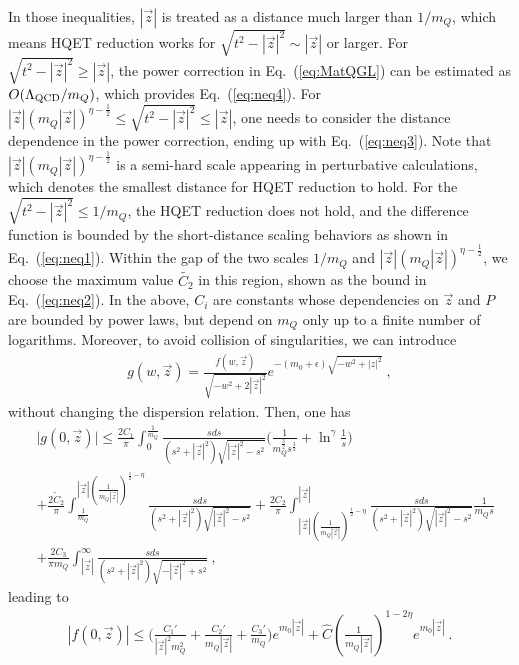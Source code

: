 \documentclass[a4paper,11pt]{article}
\begin{document}
In those inequalities, $|\vec{z}|$ is treated as a distance much larger than $1/m_Q$, which means HQET reduction works for $\sqrt{t^2-|\vec{z}|^2} \sim |\vec{z}|$ or larger. For $\sqrt{t^2-|\vec{z}|^2} \geq |\vec{z}|$, the power correction in Eq.~(\ref{eq:MatQGL}) can be estimated as $O(\Lambda_{\rm QCD}/m_Q)$, which provides Eq.~(\ref{eq:neq4}). For $|\vec{z}|\left(m_Q |\vec{z}|\right)^{\eta-\frac{1}{2}} \le \sqrt{t^2-|\vec{z}|^2}\le |\vec{z}|$, one needs to consider the distance dependence in the power correction, ending up with Eq.~(\ref{eq:neq3}). Note that $|\vec{z}|\left(m_Q |\vec{z}|\right)^{\eta-\frac{1}{2}}$ is a semi-hard scale appearing in perturbative calculations, which denotes the smallest distance for HQET reduction to hold. For the $\sqrt{t^2-|\vec{z}|^2} \le 1/m_Q$, the HQET reduction does not hold, and the difference function is bounded by the short-distance scaling behaviors as shown in Eq.~(\ref{eq:neq1}). Within the gap of the two scales $1/m_Q$ and $|\vec{z}|\left(m_Q |\vec{z}|\right)^{\eta-\frac{1}{2}}$, we choose the maximum value $\tilde{C_2}$ in this region, shown as the bound in Eq.~(\ref{eq:neq2}). In the above, $C_i$ are constants whose dependencies on $\vec{z}$ and $P$ are bounded by power laws, but depend on $m_Q$ only up to a finite number of logarithms. Moreover, to avoid collision of singularities, we can introduce 
\begin{align}
g(w,\vec{z})=\frac{f(w,\vec{z})}{\sqrt{-w^2+2|\vec{z}|^2}}e^{-(m_0+\epsilon)\sqrt{-w^2+|z|^2}} \ , 
\end{align}
without changing the dispersion relation. Then, one has
\begin{align}
&\bigg|g(0,\vec{z})\bigg| \le \frac{2C_1}{\pi}\int_0^{\frac{1}{m_Q}} \frac{sds}{(s^2+|\vec{z}|^2)\sqrt{|\vec{z}|^2-s^2}} \bigg(\frac{1}{m_Q^{\frac{3}{2}}s^{\frac{3}{2}}}+\ln^{\gamma}\frac{1}{s}\bigg) \nonumber \\ 
&+\frac{2\tilde C_2}{\pi}\int_{\frac{1}{m_Q}}^{ |\vec{z}|\left(\frac{1}{m_Q |\vec{z}|}\right)^{\frac{1}{2}-\eta}} \frac{sds} {(s^2+|\vec{z}|^2)\sqrt{|\vec{z}|^2-s^2}}+\frac{2C_2}{\pi}\int_{|\vec{z}|\left(\frac{1}{m_Q |\vec{z}|}\right)^{\frac{1}{2}-\eta}}^{|\vec{z}|} \frac{sds} {(s^2+|\vec{z}|^2)\sqrt{|\vec{z}|^2-s^2}} \frac{1}{m_Qs}\nonumber \\ 
&+\frac{2C_3 }{\pi m_Q}\int_{|\vec{z}|}^{\infty} \frac{sds} {(s^2+|\vec{z}|^2)\sqrt{-|\vec{z}|^2+s^2}}  \ ,
\end{align}
leading to
\begin{align}
|f(0,\vec{z})| \le \bigg(\frac{C_1'}{|\vec{z}|^2m_Q^2}+\frac{C_2'}{m_Q|\vec{z}|}+\frac{C_3'}{m_Q}\bigg)e^{m_0|\vec{z}|} + \hat C\left(\frac{1}{m_Q|\vec{z}|}\right)^{1-2\eta} e^{m_0|\vec{z}|} \ .  \label{eq:boundsimprov}
\end{align}
\end{document}
